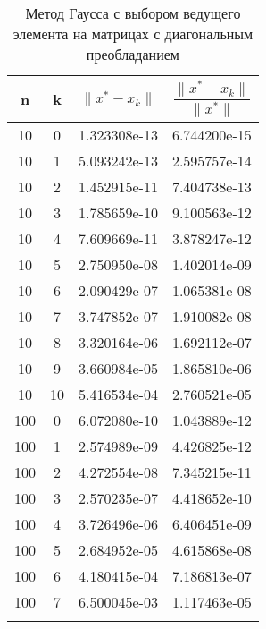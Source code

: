 \documentclass[a4paper,12pt]{article}
\begin{document}
\begin{table}[]
\centering
\caption{Метод Гаусса с выбором ведущего элемента на матрицах с диагональным преобладанием}
\begin{tabular}{|c|c|c|c|}
\hline
\rowcolor[HTML]{FFE9F5} 
n    & k  &   $\|x^* - x_k\|$           &       $\dfrac{\|x^* - x_k\|}{\|x^*\|}$       \\ \hline
\rowcolor[HTML]{F1E9FF} 
10   & 0  & 1.323308e-13 & 6.744200e-15 \\ \hline
\rowcolor[HTML]{F1E9FF} 
10   & 1  & 5.093242e-13 & 2.595757e-14 \\ \hline
\rowcolor[HTML]{F1E9FF} 
10   & 2  & 1.452915e-11 & 7.404738e-13 \\ \hline
\rowcolor[HTML]{F1E9FF} 
10   & 3  & 1.785659e-10 & 9.100563e-12 \\ \hline
\rowcolor[HTML]{F1E9FF} 
10   & 4  & 7.609669e-11 & 3.878247e-12 \\ \hline
\rowcolor[HTML]{F1E9FF} 
10   & 5  & 2.750950e-08 & 1.402014e-09 \\ \hline
\rowcolor[HTML]{F1E9FF} 
10   & 6  & 2.090429e-07 & 1.065381e-08 \\ \hline
\rowcolor[HTML]{F1E9FF} 
10   & 7  & 3.747852e-07 & 1.910082e-08 \\ \hline
\rowcolor[HTML]{F1E9FF} 
10   & 8  & 3.320164e-06 & 1.692112e-07 \\ \hline
\rowcolor[HTML]{F1E9FF} 
10   & 9  & 3.660984e-05 & 1.865810e-06 \\ \hline
\rowcolor[HTML]{F1E9FF} 
10   & 10 & 5.416534e-04 & 2.760521e-05 \\ \hline
\rowcolor[HTML]{FFE9F5} 
100  & 0  & 6.072080e-10 & 1.043889e-12 \\ \hline
\rowcolor[HTML]{FFE9F5} 
100  & 1  & 2.574989e-09 & 4.426825e-12 \\ \hline
\rowcolor[HTML]{FFE9F5} 
100  & 2  & 4.272554e-08 & 7.345215e-11 \\ \hline
\rowcolor[HTML]{FFE9F5} 
100  & 3  & 2.570235e-07 & 4.418652e-10 \\ \hline
\rowcolor[HTML]{FFE9F5} 
100  & 4  & 3.726496e-06 & 6.406451e-09 \\ \hline
\rowcolor[HTML]{FFE9F5} 
100  & 5  & 2.684952e-05 & 4.615868e-08 \\ \hline
\rowcolor[HTML]{FFE9F5} 
100  & 6  & 4.180415e-04 & 7.186813e-07 \\ \hline
\rowcolor[HTML]{FFE9F5} 
100  & 7  & 6.500045e-03 & 1.117463e-05 \\ \hline
\rowcolor[HTML]{FFE9F5} 

\end{tabular}
\end{table}
\end{document}
